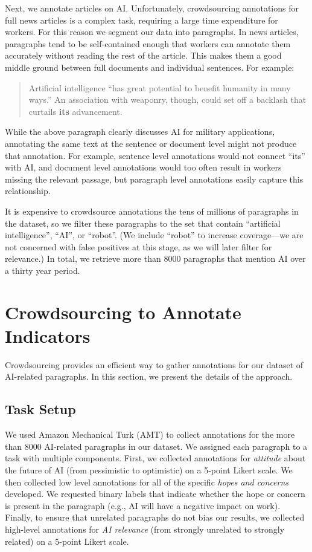 \documentclass[letterpaper]{article}
\begin{document}
Next, we annotate articles on AI. Unfortunately, crowdsourcing annotations for full news articles is a complex task, requiring a large time expenditure for workers. For this reason we segment our data into paragraphs. In news articles, paragraphs tend to be self-contained enough that workers can annotate them accurately without reading the rest of the article. %
This makes them a good middle ground between full documents and individual sentences. For example:

\begin{quote}
\small
Artificial intelligence ``has great potential to benefit humanity in many ways.'' An association with weaponry, though, could set off a backlash that curtails \textbf{its} advancement.
\normalsize
\end{quote}

While the above paragraph clearly discusses AI for military applications, annotating the same text at the sentence or document level might not produce that annotation. For example, sentence level annotations would not connect ``its'' with AI, and document level annotations would too often result in workers missing the relevant passage, but paragraph level annotations easily capture this relationship.

It is expensive to crowdsource annotations the tens of millions of paragraphs in the dataset, so we filter these paragraphs to the set that contain ``artificial intelligence'', ``AI'', or ``robot''. (We include ``robot'' to increase coverage---we are not concerned with false positives at this stage, as we will later filter for relevance.) In total, we retrieve more than 8000 paragraphs that mention AI over a thirty year period.

\section{Crowdsourcing to Annotate Indicators}

Crowdsourcing provides an efficient way to gather annotations for our dataset of AI-related paragraphs. In this section, we present the details of the approach.

\subsection{Task Setup}

We used Amazon Mechanical Turk (AMT) to collect annotations for the more than 8000 AI-related paragraphs in our dataset. We assigned each paragraph to a task with multiple components. First, we collected annotations for \textit{attitude} about the future of AI (from pessimistic to optimistic) on a 5-point Likert scale. We then collected low level annotations for all of the specific \textit{hopes and concerns} developed. We requested binary labels that indicate whether the hope or concern is present in the paragraph (e.g., AI will have a negative impact on work).
Finally, to ensure that unrelated paragraphs do not bias our results, we collected high-level annotations for \textit{AI relevance} (from strongly unrelated to strongly related) on a 5-point Likert scale.
\end{document}

